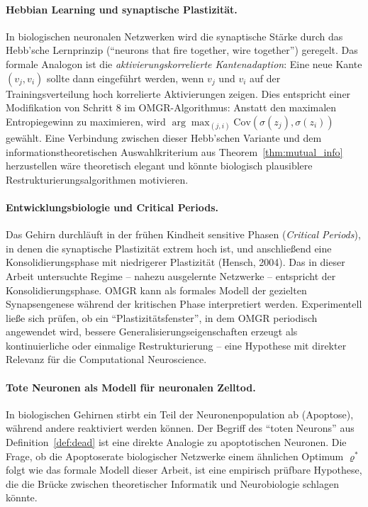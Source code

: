 ﻿\documentclass[12pt, a4paper, openany]{report}
\begin{document}
\paragraph{Hebbian Learning und synaptische Plastizität.}
In biologischen neuronalen Netzwerken wird die synaptische Stärke durch
das Hebb'sche Lernprinzip (``neurons that fire together, wire together'')
geregelt.  Das formale Analogon ist die \emph{aktivierungskorrelierte
Kantenadaption}: Eine neue Kante $(v_j, v_i)$ sollte dann eingeführt
werden, wenn $v_j$ und $v_i$ auf der Trainingsverteilung hoch korrelierte
Aktivierungen zeigen.  Dies entspricht einer Modifikation von Schritt 8 im
OMGR-Algorithmus: Anstatt den maximalen Entropiegewinn zu maximieren,
wird $\arg\max_{(j,i)} \mathrm{Cov}(\sigma(z_j), \sigma(z_i))$ gewählt.
Eine Verbindung zwischen dieser Hebb'schen Variante und dem
informationstheoretischen Auswahlkriterium aus Theorem~\ref{thm:mutual_info}
herzustellen wäre theoretisch elegant und könnte biologisch plausiblere
Restrukturierungsalgorithmen motivieren.

\paragraph{Entwicklungsbiologie und Critical Periods.}
Das Gehirn durchläuft in der frühen Kindheit sensitive Phasen
(\emph{Critical Periods}), in denen die synaptische Plastizität extrem
hoch ist, und anschließend eine Konsolidierungsphase mit niedrigerer
Plastizität (Hensch, 2004).  Das in dieser Arbeit untersuchte Regime --
nahezu ausgelernte Netzwerke -- entspricht der Konsolidierungsphase.
OMGR kann als formales Modell der gezielten Synapsengenese während
der kritischen Phase interpretiert werden.  Experimentell ließe sich
prüfen, ob ein ``Plastizitätsfenster'', in dem OMGR periodisch angewendet
wird, bessere Generalisierungseigenschaften erzeugt als kontinuierliche
oder einmalige Restrukturierung -- eine Hypothese mit direkter
Relevanz für die Computational Neuroscience.

\paragraph{Tote Neuronen als Modell für neuronalen Zelltod.}
In biologischen Gehirnen stirbt ein Teil der Neuronenpopulation ab
(Apoptose), während andere reaktiviert werden können.  Der Begriff des
``toten Neurons'' aus Definition~\ref{def:dead} ist eine direkte Analogie
zu apoptotischen Neuronen.  Die Frage, ob die Apoptoserate biologischer
Netzwerke einem ähnlichen Optimum $\varrho^*$ folgt wie das formale Modell
dieser Arbeit, ist eine empirisch prüfbare Hypothese, die die Brücke
zwischen theoretischer Informatik und Neurobiologie schlagen könnte.
\end{document}
